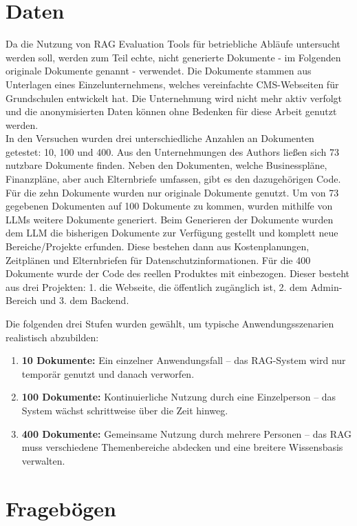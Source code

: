 \section{Daten}
Da die Nutzung von RAG Evaluation Tools für betriebliche Abläufe untersucht werden soll, werden zum Teil echte, nicht generierte Dokumente - im Folgenden originale Dokumente genannt - verwendet.
Die Dokumente stammen aus Unterlagen eines Einzelunternehmens, welches vereinfachte CMS-Webseiten für Grundschulen entwickelt hat. Die Unternehmung wird nicht mehr aktiv verfolgt und die anonymisierten Daten können ohne Bedenken für diese Arbeit genutzt werden.\\
In den Versuchen wurden drei unterschiedliche Anzahlen an Dokumenten getestet: 10, 100 und 400.
Aus den Unternehmungen des Authors ließen sich 73 nutzbare Dokumente finden. Neben den Dokumenten, welche Businesspläne, Finanzpläne, aber auch Elternbriefe umfassen, gibt es den dazugehörigen Code.
Für die zehn Dokumente wurden nur \glqq originale\grqq{} Dokumente genutzt. Um von 73 gegebenen Dokumenten auf 100 Dokumente zu kommen, wurden mithilfe von LLMs weitere Dokumente generiert.
Beim Generieren der Dokumente wurden dem LLM die bisherigen Dokumente zur Verfügung gestellt und komplett neue Bereiche/Projekte erfunden. Diese bestehen dann aus Kostenplanungen, Zeitplänen und Elternbriefen für Datenschutzinformationen.
Für die 400 Dokumente wurde der Code des reellen Produktes mit einbezogen. Dieser besteht aus drei Projekten: 1. die Webseite, die öffentlich zugänglich ist, 2. dem Admin-Bereich und 3. dem Backend.

Die folgenden drei Stufen wurden gewählt, um typische Anwendungsszenarien realistisch abzubilden:
\begin{enumerate}
    \item \textbf{10 Dokumente:} Ein einzelner Anwendungsfall – das RAG-System wird nur temporär genutzt und danach verworfen.
    \item \textbf{100 Dokumente:} Kontinuierliche Nutzung durch eine Einzelperson – das System wächst schrittweise über die Zeit hinweg.
    \item \textbf{400 Dokumente:} Gemeinsame Nutzung durch mehrere Personen – das RAG muss verschiedene Themenbereiche abdecken und eine breitere Wissensbasis verwalten.
\end{enumerate}

\section{Fragebögen}

